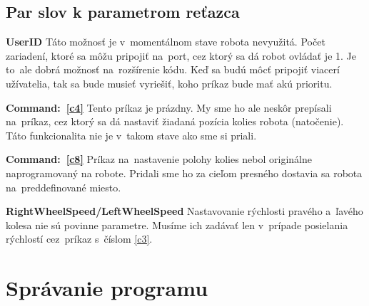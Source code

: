\subsection{Par slov k parametrom reťazca}

\noindent \textbf{UserID} \newline
\indent Táto možnosť je v~momentálnom stave robota nevyužitá. Počet zariadení, ktoré sa môžu pripojiť na~port, cez ktorý sa dá robot ovládať
je 1. Je to~ale dobrá možnosť na~rozšírenie kódu. Keď sa budú môcť pripojiť viacerí užívatelia, tak sa bude musieť vyriešiť, koho príkaz
bude mať akú prioritu. \newline

\noindent \textbf{Command:~\ref{c4}} \newline
\indent Tento príkaz je prázdny. My sme ho ale neskôr prepísali na~príkaz, cez ktorý sa dá nastaviť žiadaná pozícia kolies robota (natočenie).
Táto funkcionalita nie je v~takom stave ako sme si priali. \newline

\noindent \textbf{Command:~\ref{c8}} \newline
\indent Príkaz na~nastavenie polohy kolies nebol originálne naprogramovaný na robote. Pridali sme ho za cieľom presného dostavia sa robota
na~preddefinované miesto. \newline

\noindent \textbf{RightWheelSpeed/LeftWheelSpeed} \newline
\indent Nastavovanie rýchlosti pravého a~ľavého kolesa nie sú povinne parametre. Musíme ich zadávať len v~prípade posielania rýchlostí
cez~príkaz s~číslom \ref{c3}.

\section{Správanie programu}
\label{sec:program}

